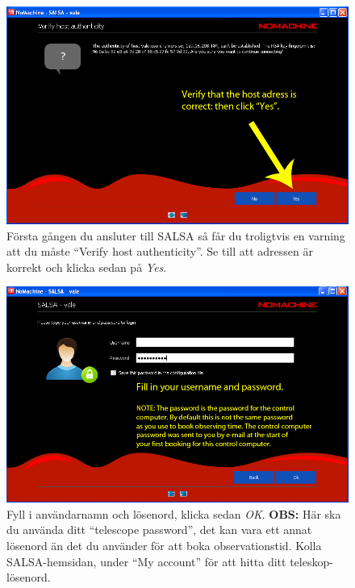 \begin{figure}[H]
    \centering
    \includegraphics[height=0.25\paperheight]{../figures/nomachinefigs/fig5_verify.png}
    \caption{Första gången du ansluter till SALSA så får du troligtvis en varning att du måste ``Verify host authenticity''. Se till att adressen är korrekt och klicka sedan på \emph{Yes}.}
    \label{fig:verify}
\end{figure}
\begin{figure}[H]
    \centering
    \includegraphics[height=0.25\paperheight]{../figures/nomachinefigs/fig6_userpass.png}
    \caption{Fyll i användarnamn och lösenord, klicka sedan \emph{OK}.  {\bf
OBS:} Här ska du använda ditt ``telescope password'', det kan vara ett annat
lösenord än det du använder för att boka observationstid. Kolla SALSA-hemsidan,
under ``My account'' för att hitta ditt teleskop-lösenord.  }
    \label{fig:userpass}
\end{figure}
